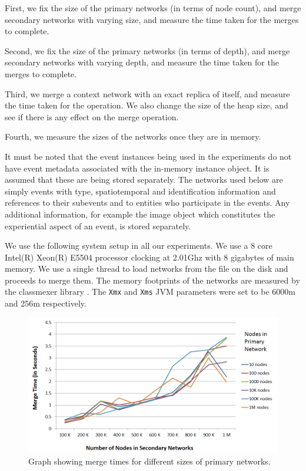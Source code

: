 First, we fix the size of the primary networks (in terms of node count), and merge secondary networks with varying size, and measure the time taken for the merges to complete.

Second, we fix the size of the primary networks (in terms of depth), and merge secondary networks with varying depth, and measure the time taken for the merges to complete.

Third, we merge a context network with an exact replica of itself, and measure the time taken for the operation. We also change the size of the heap size, and see if there is any effect on the merge operation.

Fourth, we measure the sizes of the networks once they are in memory.

It must be noted that the event instances being used in the experiments do not have event metadata associated with the in-memory instance object. It is assumed that these are being stored separately. The networks used below are simply events with type, spatiotemporal and identification information and references to their subevents and to entities who participate in the events. Any additional information, for example the image object which constitutes the experiential aspect of an event, is stored separately.

We use the following system setup in all our experiments. We use a 8 core Intel(R) Xeon(R) E5504 processor clocking at 2.01Ghz with 8 gigabytes of main memory. We use a single thread to load networks from the file on the disk and proceeds to merge them. The memory footprints of the networks are measured by the classmexer library \cite{classmexer}. The \texttt{Xmx} and \texttt{Xms} JVM parameters were set to be 6000m and 256m respectively.


\begin{figure}[t]
\centering
\includegraphics[width=\textwidth]{media/chapter5/axis/perf/mergebignodetest.png}
\caption{Graph showing merge times for different sizes of primary networks.}
\label{fig:agg-merge-tests}
\end{figure}


